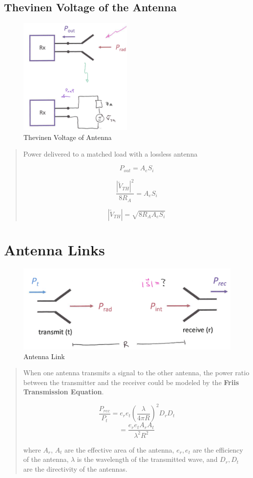 \documentclass{article} %
\begin{document}
\subsection{Thevinen Voltage of the Antenna}
\begin{figure}[H]
    \centering
    \includegraphics[width=0.5\textwidth]{./image/figure7.png}
    \caption{Thevinen Voltage of Antenna}
\end{figure}
\begin{quote}
    Power delivered to a matched load with a lossless antenna

    \[P_{out} = A_e S_i\]

    \[\frac{|\tilde{V}_{TH}|^2}{8R_A} = A_e S_i\]

    \[|\tilde{V}_{TH}| = \sqrt{8 R_A A_e S_i}\]
\end{quote}

\section{Antenna Links}

\begin{figure}[H]
    \centering
    \includegraphics[width=1\textwidth]{./image/figure8.png}
    \caption{Antenna Link}
\end{figure}

\begin{quote}
    When one antenna transmits a signal to the other antenna, the power ratio between the transmitter and the receiver could be modeled by the \textbf{Friis Transmission Equation}.

    \[\frac{P_{rec}}{P_{t}} = e_r e_t \left(\frac{\lambda}{4\pi R}\right)^2 D_r D_t\]
    \[= \frac{e_r e_t A_r A_t}{\lambda^2 R^2}\]

    where $A_r$, $A_t$ are the effective area of the antenna, $e_r, e_t$ are the efficiency of the antenna, $\lambda$ is the wavelength of the transmitted wave, and $D_r, D_t$ are the directivity of the antennas.


\end{quote}
\end{document}
